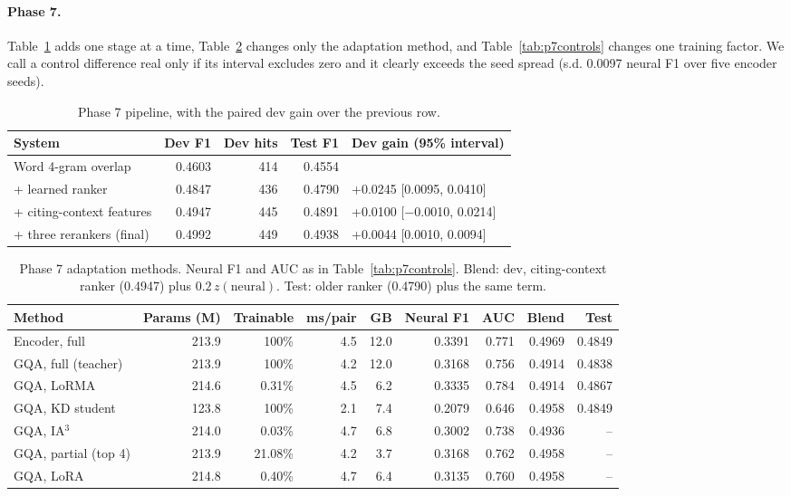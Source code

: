 \paragraph{Phase 7.} Table~\ref{tab:p7steps} adds one stage at a time, Table~\ref{tab:p7methods} changes only the adaptation method, and Table~\ref{tab:p7controls} changes one training factor. We call a control difference real only if its interval excludes zero and it clearly exceeds the seed spread (s.d. 0.0097 neural F1 over five encoder seeds).

\begin{table}[H]
\centering\small
\caption{Phase 7 pipeline, with the paired dev gain over the previous row.}
\label{tab:p7steps}
\begin{tabular}{lrrrl}
\toprule
System & Dev F1 & Dev hits & Test F1 & Dev gain (95\% interval) \\
\midrule
Word 4-gram overlap & 0.4603 & 414 & 0.4554 & \\
+ learned ranker & 0.4847 & 436 & 0.4790 & +0.0245 [0.0095, 0.0410] \\
+ citing-context features & 0.4947 & 445 & 0.4891 & +0.0100 [$-$0.0010, 0.0214] \\
+ three rerankers (final) & 0.4992 & 449 & 0.4938 & +0.0044 [0.0010, 0.0094] \\
\bottomrule
\end{tabular}
\end{table}

\begin{table}[H]
\centering\small
\caption{Phase 7 adaptation methods. Neural F1 and AUC as in Table~\ref{tab:p7controls}. Blend: dev, citing-context ranker (0.4947) plus $0.2\,z(\text{neural})$. Test: older ranker (0.4790) plus the same term.}
\label{tab:p7methods}
\begin{tabular}{lrrrrrrrr}
\toprule
Method & Params (M) & Trainable & ms/pair & GB & Neural F1 & AUC & Blend & Test \\
\midrule
Encoder, full & 213.9 & 100\% & 4.5 & 12.0 & 0.3391 & 0.771 & 0.4969 & 0.4849 \\
GQA, full (teacher) & 213.9 & 100\% & 4.2 & 12.0 & 0.3168 & 0.756 & 0.4914 & 0.4838 \\
GQA, LoRMA & 214.6 & 0.31\% & 4.5 & 6.2 & 0.3335 & 0.784 & 0.4914 & 0.4867 \\
GQA, KD student & 123.8 & 100\% & 2.1 & 7.4 & 0.2079 & 0.646 & 0.4958 & 0.4849 \\
GQA, IA$^3$ & 214.0 & 0.03\% & 4.7 & 6.8 & 0.3002 & 0.738 & 0.4936 & -- \\
GQA, partial (top 4) & 213.9 & 21.08\% & 4.2 & 3.7 & 0.3168 & 0.762 & 0.4958 & -- \\
GQA, LoRA & 214.8 & 0.40\% & 4.7 & 6.4 & 0.3135 & 0.760 & 0.4958 & -- \\
\bottomrule
\end{tabular}
\end{table}

